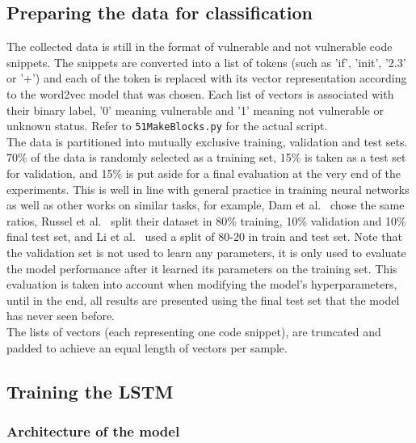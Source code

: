 \documentclass[
a4paper,
pagesize,
pdftex,
12pt,
twoside, %
BCOR=5mm, %
ngerman,
fleqn,
final,
]{scrartcl}
\begin{document}
	\subsection{Preparing the data for classification}
	The collected data is still in the format of vulnerable and not vulnerable code snippets. The snippets are converted into a list of tokens (such as 'if', 'init', '2.3' or '+') and each of the token is replaced with its vector representation according to the word2vec model that was chosen. Each list of vectors is associated with their binary label, '0' meaning vulnerable and '1' meaning not vulnerable or unknown status. Refer to \texttt{51MakeBlocks.py} for the actual script.\\
	The data is partitioned into mutually exclusive training, validation and test sets. 70\% of the data is randomly selected as a training set, 15\% is taken as a test set for validation, and 15\% is put aside for a final evaluation at the very end of the experiments. This is well in line with general practice in training neural networks as well as other works on similar tasks, for example, Dam et al.~\cite{Dam.2016} chose the same ratios, Russel et al.~\cite{Russell.2018} split their dataset in 80\% training, 10\% validation and 10\% final test set, and Li et al.~\cite{Li.2018} used a split of 80-20 in train and test set. Note that the validation set is not used to learn any parameters, it is only used to evaluate the model performance after it learned its parameters on the training set. This evaluation is taken into account when modifying the model's hyperparameters, until in the end, all results are presented using the final test set that the model has never seen before.\\
	The lists of vectors (each representing one code snippet), are truncated and padded to achieve an equal length of vectors per sample.
	
	\subsection{Training the LSTM}
	
	\subsubsection{Architecture of the model}
	
\end{document}
